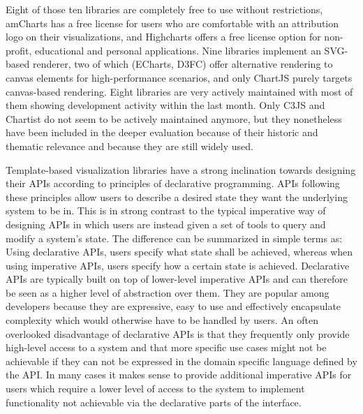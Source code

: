 Eight of those ten libraries are completely free to use without
restrictions, amCharts has a free license for users who are
comfortable with an attribution logo on their visualizations, and
Highcharts offers a free license option for non-profit, educational
and personal applications.  Nine libraries implement an SVG-based
renderer, two of which (ECharts, D3FC) offer alternative rendering to
canvas elements for high-performance scenarios, and only ChartJS
purely targets canvas-based rendering.  Eight libraries are very
actively maintained with most of them showing development activity
within the last month.  Only C3JS and Chartist do not seem to be
actively maintained anymore, but they nonetheless have been included
in the deeper evaluation because of their historic and thematic
relevance and because they are still widely used.

Template-based visualization libraries have a strong inclination
towards designing their APIs according to principles of declarative
programming.  APIs following these principles allow users to describe
a desired state they want the underlying system to be in.  This is in
strong contrast to the typical imperative way of designing APIs in
which users are instead given a set of tools to query and modify a
system's state.  The difference can be summarized in simple terms as:
Using declarative APIs, users specify what state shall be achieved,
whereas when using imperative APIs, users specify how a certain state
is achieved.  Declarative APIs are typically built on top of
lower-level imperative APIs and can therefore be seen as a higher
level of abstraction over them.  They are popular among developers
because they are expressive, easy to use and effectively encapsulate
complexity which would otherwise have to be handled by users.  An
often overlooked disadvantage of declarative APIs is that they
frequently only provide high-level access to a system and that more
specific use cases might not be achievable if they can not be
expressed in the domain specific language defined by the API.  In many
cases it makes sense to provide additional imperative APIs for users
which require a lower level of access to the system to implement
functionality not achievable via the declarative parts of the
interface.

